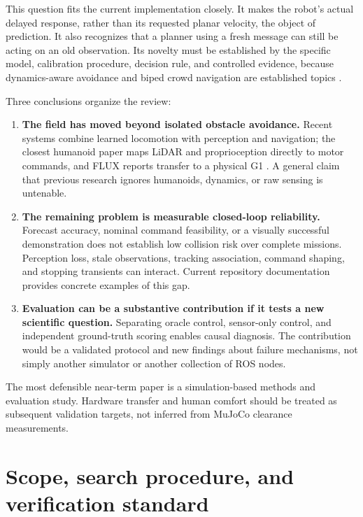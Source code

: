 \documentclass[11pt,a4paper]{article}
\begin{document}
This question fits the current implementation closely. It makes the robot's
actual delayed response, rather than its requested planar velocity, the object
of prediction. It also recognizes that a planner using a fresh message can
still be acting on an old observation. Its novelty must be established by
the specific model, calibration procedure, decision rule, and controlled
evidence, because dynamics-aware avoidance and biped crowd navigation are
established topics \citep{dwa,vo,biped2016}.

Three conclusions organize the review:
\begin{enumerate}
\item \textbf{The field has moved beyond isolated obstacle avoidance.}
Recent systems combine learned locomotion with perception and navigation;
the closest humanoid paper maps LiDAR and proprioception directly to motor
commands, and FLUX reports transfer to a physical G1
\citep{safehumanoid,flux}. A general claim that previous research ignores
humanoids, dynamics, or raw sensing is untenable.
\item \textbf{The remaining problem is measurable closed-loop reliability.}
Forecast accuracy, nominal command feasibility, or a visually successful
demonstration does not establish low collision risk over complete missions.
Perception loss, stale observations, tracking association, command shaping,
and stopping transients can interact. Current repository documentation
provides concrete examples of this gap.
\item \textbf{Evaluation can be a substantive contribution if it tests a new
scientific question.} Separating oracle control, sensor-only control, and
independent ground-truth scoring enables causal diagnosis. The contribution
would be a validated protocol and new findings about failure mechanisms,
not simply another simulator or another collection of ROS nodes.
\end{enumerate}

The most defensible near-term paper is a simulation-based methods and evaluation
study. Hardware transfer and human comfort should be treated as subsequent
validation targets, not inferred from MuJoCo clearance measurements.

\section{Scope, search procedure, and verification standard}
\label{sec:method}
\end{document}

